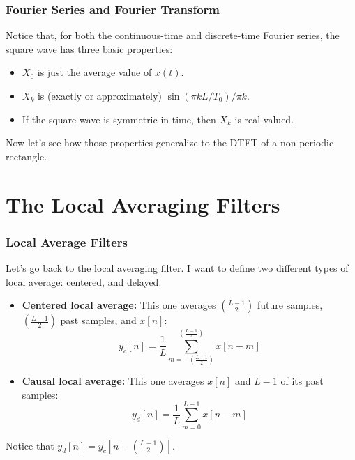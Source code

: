 \documentclass{beamer}
\begin{document}
\begin{frame}
  \frametitle{Fourier Series and Fourier Transform}

  Notice that, for both the continuous-time and discrete-time Fourier
  series, the square wave has three basic properties:
  \begin{itemize}
  \item $X_0$ is just the average value of $x(t)$.
  \item $X_k$ is (exactly or approximately) $\sin(\pi kL/T_0)/\pi k$.
  \item If the square wave is symmetric in time, then $X_k$ is
    real-valued.
  \end{itemize}
  Now let's see how those properties generalize to the DTFT of a
  non-periodic rectangle.
\end{frame}

\section[Averaging]{The Local Averaging Filters}
\setcounter{subsection}{1}

\begin{frame}
  \frametitle{Local Average Filters}

  Let's go back to the local averaging filter. I want to define two 
  different types of local average: centered, and delayed.
  \begin{itemize}
  \item {\bf Centered local average:} This one averages
    $\left(\frac{L-1}{2}\right)$ future samples,
    $\left(\frac{L-1}{2}\right)$ past samples, and $x[n]$:
    \[
    y_c[n] = \frac{1}{L}\sum_{m=-\left(\frac{L-1}{2}\right)}^{\left(\frac{L-1}{2}\right)} x[n-m]
    \]
  \item {\bf Causal local average:} This one averages $x[n]$ and $L-1$ of its
    past samples:
    \[
    y_d[n] = \frac{1}{L}\sum_{m=0}^{L-1} x[n-m]
    \]
  \end{itemize}
  Notice that $y_d[n] = y_c\left[n-\left(\frac{L-1}{2}\right)\right]$.
\end{frame}
\end{document}
